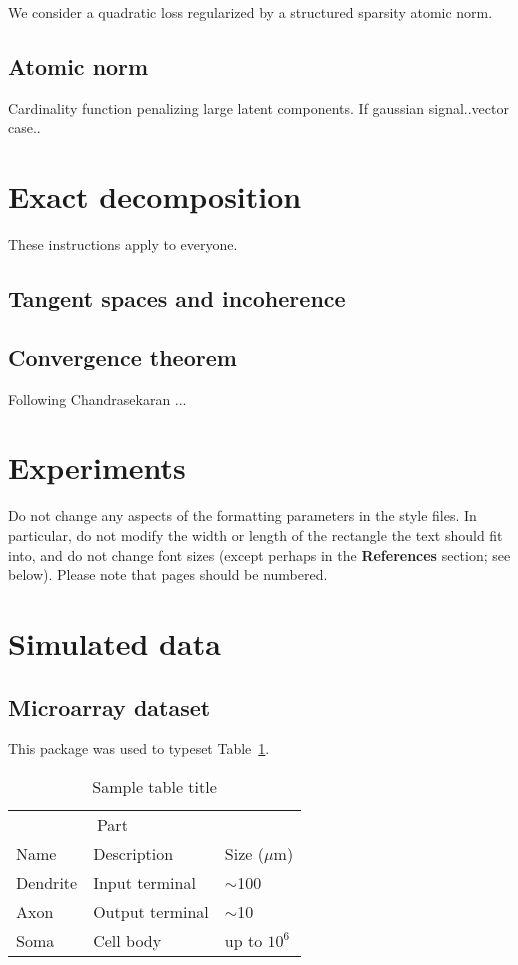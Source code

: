 \documentclass{article}
\begin{document}
We consider a quadratic loss regularized by a structured sparsity atomic norm.

\subsection{Atomic norm}

Cardinality function penalizing large latent components.
If gaussian signal..vector case..


\section{Exact decomposition}
\label{others}

These instructions apply to everyone.

\subsection{Tangent spaces and incoherence}


\subsection{Convergence theorem}

Following Chandrasekaran ...


\section{Experiments}

Do not change any aspects of the formatting parameters in the style
files.  In particular, do not modify the width or length of the
rectangle the text should fit into, and do not change font sizes
(except perhaps in the \textbf{References} section; see below). Please
note that pages should be numbered.

\section{Simulated data}


\subsection{Microarray dataset}

This package was used to typeset Table~\ref{sample-table}.

\begin{table}[t]
  \caption{Sample table title}
  \label{sample-table}
  \centering
  \begin{tabular}{lll}
    \toprule
    \multicolumn{2}{c}{Part}                   \\
    \cmidrule{1-2}
    Name     & Description     & Size ($\mu$m) \\
    \midrule
    Dendrite & Input terminal  & $\sim$100     \\
    Axon     & Output terminal & $\sim$10      \\
    Soma     & Cell body       & up to $10^6$  \\
    \bottomrule
  \end{tabular}
\end{table}
\end{document}
